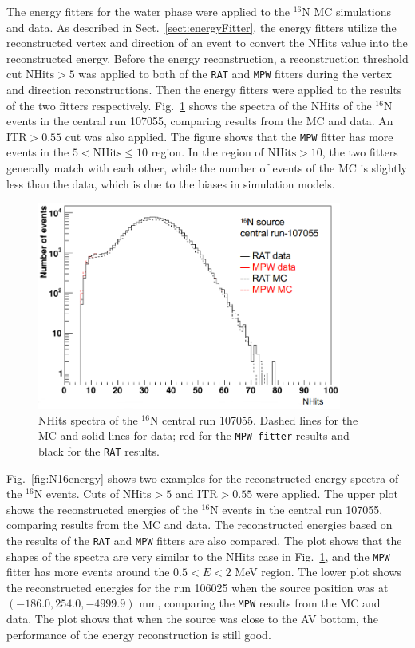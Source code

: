The energy fitters for the water phase were applied to the $^{16}$N MC simulations and data. As described in Sect.~\ref{sect:energyFitter}, the energy fitters utilize the reconstructed vertex and direction of an event to convert the NHits value into the reconstructed energy. Before the energy reconstruction, a reconstruction threshold cut $\mathrm{NHits}>5$ was applied to both of the \texttt{RAT} and \texttt{MPW} fitters during the vertex and direction reconstructions. Then the energy fitters were applied to the results of the two fitters respectively. Fig.~\ref{fig:N16nhits} shows the spectra of the NHits of the $^{16}$N events in the central run 107055, comparing results from the MC and data. An $\mathrm{ITR}>0.55$ cut was also applied. The figure shows that the \texttt{MPW} fitter has more events in the $5<\mathrm{NHits}\leq 10$ region. In the region of $\mathrm{NHits}>10$, the two fitters generally match with each other, while the number of events of the MC is slightly less than the data, which is due to the biases in simulation models. 

\begin{figure}[htbp]
	\centering
	\includegraphics[width=10cm]{N16_nhits_107055.png}
	\caption[NHits spectra of the $^{16}$N central run 107055.]{NHits spectra of the $^{16}$N central run 107055. Dashed lines for the MC and solid lines for data; red for the \texttt{MPW fitter} results and black for the \texttt{RAT} results.\label{fig:N16nhits}}	
\end{figure}

Fig.~\ref{fig:N16energy} shows two examples for the reconstructed energy spectra of the $^{16}$N events. Cuts of $\mathrm{NHits}>5$ and $\mathrm{ITR}>0.55$ were applied. The upper plot shows the reconstructed energies of the $^{16}$N events in the central run 107055, comparing results from the MC and data. The reconstructed energies based on the results of the \texttt{RAT} and \texttt{MPW} fitters are also compared. The plot shows that the shapes of the spectra are very similar to the NHits case in Fig.~\ref{fig:N16nhits}, and the \texttt{MPW} fitter has more events around the $0.5<E<2$ MeV region. The lower plot shows the reconstructed energies for the run 106025 when the source position was at $(-186.0,254.0,-4999.9)$ mm, comparing the \texttt{MPW} results from the MC and data. The plot shows that when the source was close to the AV bottom, the performance of the energy reconstruction is still good.


